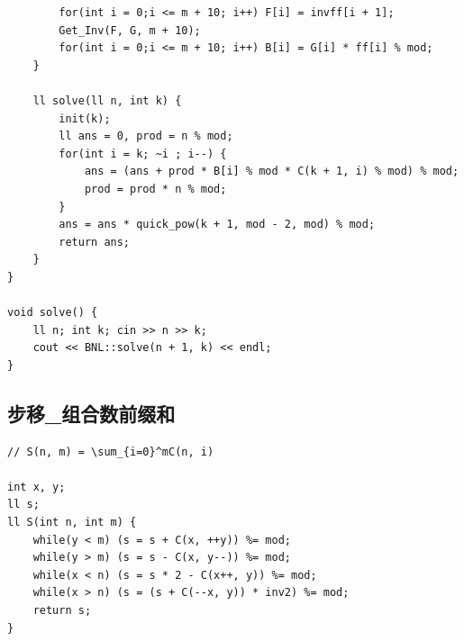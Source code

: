 \documentclass[twoside]{article}
\begin{document}
\begin{lstlisting}
        for(int i = 0;i <= m + 10; i++) F[i] = invff[i + 1];
        Get_Inv(F, G, m + 10);
        for(int i = 0;i <= m + 10; i++) B[i] = G[i] * ff[i] % mod;
    }

    ll solve(ll n, int k) {
        init(k);
        ll ans = 0, prod = n % mod;
        for(int i = k; ~i ; i--) {
            ans = (ans + prod * B[i] % mod * C(k + 1, i) % mod) % mod;
            prod = prod * n % mod;
        }
        ans = ans * quick_pow(k + 1, mod - 2, mod) % mod;
        return ans;
    }
}

void solve() {
    ll n; int k; cin >> n >> k;
    cout << BNL::solve(n + 1, k) << endl;
}\end{lstlisting}
\subsection{步移_组合数前缀和}
\begin{lstlisting}
// S(n, m) = \sum_{i=0}^mC(n, i)

int x, y;
ll s;
ll S(int n, int m) {
    while(y < m) (s = s + C(x, ++y)) %= mod;
    while(y > m) (s = s - C(x, y--)) %= mod;
    while(x < n) (s = s * 2 - C(x++, y)) %= mod;
    while(x > n) (s = (s + C(--x, y)) * inv2) %= mod;
    return s;
}

\end{lstlisting}
\end{document}

